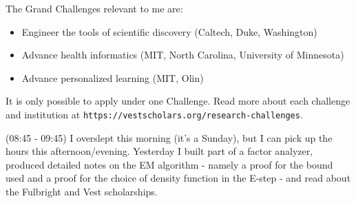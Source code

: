 \documentclass[idxtotoc,hyperref,openany]{labbook} %
\begin{document}
The Grand Challenges relevant to me are:
\begin{itemize}
\item Engineer the tools of scientific discovery (Caltech, Duke, Washington)
\item Advance health informatics (MIT, North Carolina, University of Minnesota)
\item Advance personalized learning (MIT, Olin)
\end{itemize}
It is only possible to apply under one Challenge. Read more about each challenge and institution at \texttt{https://vestscholars.org/research-challenges}.



(08:45 - 09:45) I overslept this morning (it's a Sunday), but I can pick up the hours this afternoon/evening. Yesterday I built part of a factor analyzer, produced detailed notes on the EM algorithm - namely a proof for the bound used and a proof for the choice of density function in the E-step - and read about the Fulbright and Vest scholarships.
\end{document}
